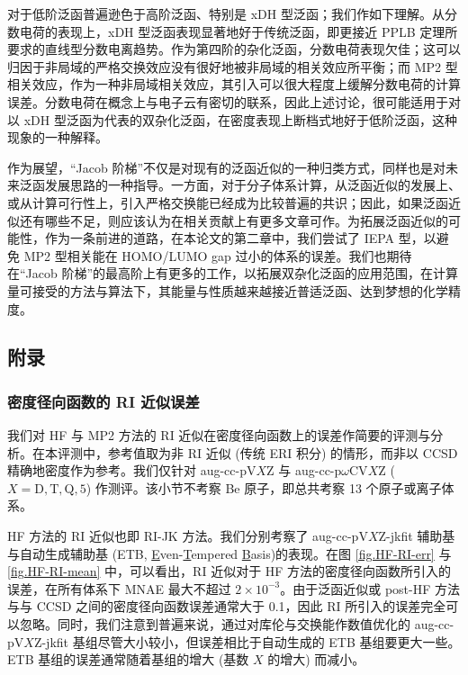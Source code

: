 对于低阶泛函普遍逊色于高阶泛函、特别是 xDH 型泛函；我们作如下理解。从分数电荷的表现上，xDH 型泛函表现显著地好于传统泛函\cite{Su-Xu.IJQC.2015, Su-Xu.WCMS.2016, Su-Xu.MP.2016, Su-Xu.ARPC.2017}，即更接近 PPLB 定理所要求的直线型分数电离趋势\cite{Perdew-Balduz.PRL.1982}。作为第四阶的杂化泛函，分数电荷表现欠佳；这可以归因于非局域的严格交换效应没有很好地被非局域的相关效应所平衡；而 MP2 型相关效应，作为一种非局域相关效应，其引入可以很大程度上缓解分数电荷的计算误差。分数电荷在概念上与电子云有密切的联系，因此上述讨论，很可能适用于对以 xDH 型泛函为代表的双杂化泛函，在密度表现上断档式地好于低阶泛函，这种现象的一种解释。

作为展望，“Jacob 阶梯”不仅是对现有的泛函近似的一种归类方式，同样也是对未来泛函发展思路的一种指导。一方面，对于分子体系计算，从泛函近似的发展上、或从计算可行性上，引入严格交换能已经成为比较普遍的共识；因此，如果泛函近似还有哪些不足，则应该认为在相关贡献上有更多文章可作。为拓展泛函近似的可能性，作为一条前进的道路，在本论文的第二章中，我们尝试了 IEPA 型，以避免 MP2 型相关能在 HOMO/LUMO gap 过小的体系的误差。我们也期待在“Jacob 阶梯”的最高阶上有更多的工作，以拓展双杂化泛函的应用范围，在计算量可接受的方法与算法下，其能量与性质越来越接近普适泛函、达到梦想的化学精度。

\subsection{附录}

\subsubsection{密度径向函数的 RI 近似误差}

我们对 HF 与 MP2 方法的 RI 近似在密度径向函数上的误差作简要的评测与分析。在本评测中，参考值取为非 RI 近似 (传统 ERI 积分) 的情形，而非以 CCSD 精确地密度作为参考。我们仅针对 aug-cc-pV$X$Z 与 aug-cc-p$\omega$CV$X$Z ($X=\mathrm{D,T,Q,5}$) 作测评。该小节不考察 Be 原子，即总共考察 13 个原子或离子体系。

HF 方法的 RI 近似也即 RI-JK 方法。我们分别考察了 aug-cc-pV$X$Z-jkfit 辅助基\cite{Weigend-Weigend.PCCP.2002}与自动生成辅助基 (ETB, \underline{E}ven-\underline{T}empered \underline{B}asis)\cite{Stoychev-Neese.JCTC.2017}的表现。在图 \ref{fig.HF-RI-err} 与 \ref{fig.HF-RI-mean} 中，可以看出，RI 近似对于 HF 方法的密度径向函数所引入的误差，在所有体系下 MNAE 最大不超过 $2 \times 10^{-3}$。由于泛函近似或 post-HF 方法与与 CCSD 之间的密度径向函数误差通常大于 0.1，因此 RI 所引入的误差完全可以忽略。同时，我们注意到普遍来说，通过对库伦与交换能作数值优化的 aug-cc-pV$X$Z-jkfit 基组尽管大小较小，但误差相比于自动生成的 ETB 基组要更大一些。ETB 基组的误差通常随着基组的增大 (基数 $X$ 的增大) 而减小。

